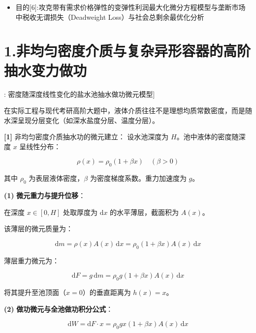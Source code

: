 \documentclass[11pt,a4paper,UTF8]{ctexart}
\begin{document}
\begin{targetbox}[本章复习目标与核心知识图谱]
\begin{itemize}
  \item 目的[6]:攻克带有需求价格弹性的变弹性利润最大化微分方程模型与垄断市场中税收无谓损失（Deadweight Loss）与社会总剩余最优化分析
\end{itemize}
\end{targetbox}


\section{1.非均匀密度介质与复杂异形容器的高阶抽水变力做功}

\begin{thmbox}[模型[1]: 密度随深度线性变化的盐水池抽水做功微元模型]

在实际工程与现代考研高阶大题中，液体介质往往不是理想均质常数密度，而是随水深呈现分层变化（如深水盐度分层、温度分层）。

\textbf{[1]} 非均匀密度介质抽水功的微元建立：
设水池深度为 $H$。池中液体的密度随深度 $x$ 呈线性分布：


\begin{equation*}
\rho(x) = \rho_0(1 + \beta x) \quad (\beta > 0)
\end{equation*}


其中 $\rho_0$ 为表层液体密度，$\beta$ 为密度梯度系数。重力加速度为 $g$。

\textbf{(1)}  \textbf{微元重力与提升位移}：

在深度 $x \in [0, H]$ 处取厚度为 $\mathrm{d}x$ 的水平薄层，截面积为 $A(x)$。

该薄层的微元质量为：


\begin{equation*}
\mathrm{d}m = \rho(x) A(x)\,\mathrm{d}x = \rho_0(1 + \beta x) A(x)\,\mathrm{d}x
\end{equation*}


薄层重力微元为：


\begin{equation*}
\mathrm{d}F = g\,\mathrm{d}m = \rho_0 g(1 + \beta x) A(x)\,\mathrm{d}x
\end{equation*}


将其提升至池顶面（$x = 0$）的垂直距离为 $h(x) = x$。

\textbf{(2)}  \textbf{做功微元与全池做功积分公式}：


\begin{equation*}
\mathrm{d}W = \mathrm{d}F \cdot x = \rho_0 g x(1 + \beta x) A(x)\,\mathrm{d}x
\end{equation*}



\end{thmbox}
\end{document}
